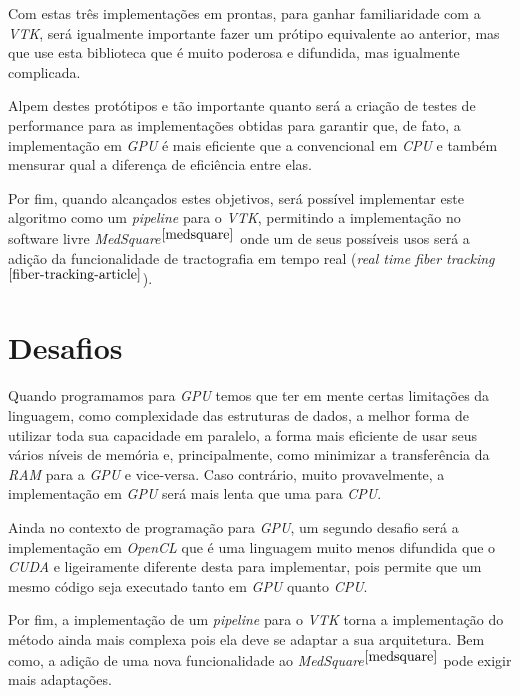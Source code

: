 Com estas três implementações em prontas, para ganhar familiaridade com a \textit{VTK}, será igualmente importante fazer um prótipo equivalente ao anterior, mas que use esta biblioteca que é muito poderosa e difundida, mas igualmente complicada.

Alpem destes protótipos e tão importante quanto será a criação de testes de performance para as implementações obtidas para garantir que, de fato, a implementação em \textit{GPU} é mais eficiente que a convencional em \textit{CPU} e também mensurar qual a diferença de eficiência entre elas.

Por fim, quando alcançados estes objetivos, será possível implementar este algoritmo como um \textit{pipeline} para o \textit{VTK}, permitindo a implementação no software livre \textit{MedSquare}$^{\ref{medsquare}}$ onde um de seus possíveis usos será a adição da funcionalidade de tractografia em tempo real (\textit{real time fiber tracking}$^{\ref{fiber-tracking-article}}$).

\section{Desafios}
Quando programamos para \textit{GPU} temos que ter em mente certas limitações da linguagem, como complexidade das estruturas de dados, a melhor forma de utilizar toda sua capacidade em paralelo, a forma mais eficiente de usar seus vários níveis de memória e, principalmente, como minimizar a transferência da \textit{RAM} para a \textit{GPU} e vice-versa. Caso contrário, muito provavelmente, a implementação em \textit{GPU} será mais lenta que uma para \textit{CPU}.

Ainda no contexto de programação para \textit{GPU}, um segundo desafio será a implementação em \textit{OpenCL} que é uma linguagem muito menos difundida que o \textit{CUDA} e ligeiramente diferente desta para implementar, pois permite que um mesmo código seja executado tanto em \textit{GPU} quanto \textit{CPU}.

Por fim, a implementação de um \textit{pipeline} para o \textit{VTK} torna a implementação do método ainda mais complexa pois ela deve se adaptar a sua arquitetura. Bem como, a adição de uma nova funcionalidade ao \textit{MedSquare}$^{\ref{medsquare}}$ pode exigir mais adaptações.
